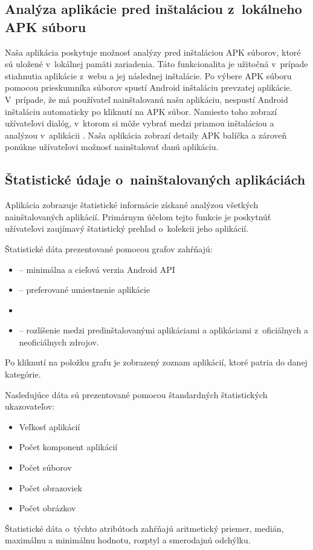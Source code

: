 \subsection{Analýza aplikácie pred inštaláciou z~lokálneho APK súboru}
Naša aplikácia poskytuje možnosť analýzy pred inštaláciou APK súborov, ktoré sú uložené v~lokálnej pamäti zariadenia. Táto funkcionalita je užitočná v~prípade stiahnutia aplikácie z~webu a jej následnej inštalácie. Po výbere APK súboru pomocou prieskumníka súborov spustí Android inštaláciu prevzatej aplikácie. V~prípade, že má používateľ nainštalovanú našu aplikáciu, nespustí Android inštaláciu automaticky po kliknutí na APK súbor. Namiesto toho zobrazí užívateľovi dialóg, v~ktorom si môže vybrať medzi priamou inštaláciou a analýzou v~aplikácii . Naša aplikácia zobrazí detaily APK balíčka a zároveň ponúkne užívateľovi možnosť nainštalovať danú aplikáciu.

\subsection{Štatistické údaje o~nainštalovaných aplikáciách}
Aplikácia zobrazuje štatistické informácie získané analýzou všetkých nainštalovaných aplikácií. Primárnym účelom tejto funkcie je poskytnúť užívateľovi zaujímavý štatistický prehľad o~kolekcii jeho aplikácií. 

\noindent Štatistické dáta prezentované pomocou grafov zahŕňajú:
\begin{itemize}
	\item {} -- minimálna a cieľová verzia Android API
	\item {} -- preferované umiestnenie aplikácie
	\item {}
	\item {} -- rozlíšenie medzi predinštalovanými aplikáciami a aplikáciami z~oficiálnych a neoficiálnych zdrojov. 
\end{itemize}

\noindent Po kliknutí na položku grafu je zobrazený zoznam aplikácií, ktoré patria do danej kategórie.

\noindent Nasledujúce dáta sú prezentované pomocou štandardných štatistických ukazovateľov:
\begin{itemize}
	\item Veľkosť aplikácií
	\item Počet komponent aplikácií
	\item Počet súborov
	\item Počet obrazoviek
	\item Počet obrázkov
\end{itemize}
Štatistické dáta o~týchto atribútoch zahŕňajú aritmetický priemer, medián, maximálnu a minimálnu hodnotu, rozptyl a smerodajnú odchýlku. 


